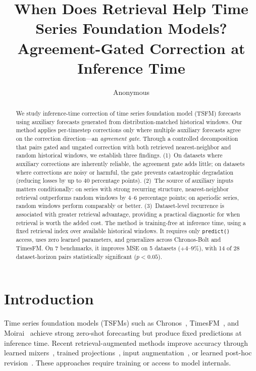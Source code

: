 \documentclass{article}
\title{When Does Retrieval Help Time Series Foundation Models?\\Agreement-Gated Correction at Inference Time}
\author{Anonymous}
\begin{document}
\maketitle

\begin{abstract}
We study inference-time correction of time series foundation model (TSFM) forecasts using auxiliary forecasts generated from distribution-matched historical windows. Our method applies per-timestep corrections only where multiple auxiliary forecasts agree on the correction direction---an \emph{agreement gate}. Through a controlled decomposition that pairs gated and ungated correction with both retrieved nearest-neighbor and random historical windows, we establish three findings. (1)~On datasets where auxiliary corrections are inherently reliable, the agreement gate adds little; on datasets where corrections are noisy or harmful, the gate prevents catastrophic degradation (reducing losses by up to 40 percentage points). (2)~The source of auxiliary inputs matters conditionally: on series with strong recurring structure, nearest-neighbor retrieval outperforms random windows by 4--6 percentage points; on aperiodic series, random windows perform comparably or better. (3)~Dataset-level recurrence is associated with greater retrieval advantage, providing a practical diagnostic for when retrieval is worth the added cost. The method is training-free at inference time, using a fixed retrieval index over available historical windows. It requires only \texttt{predict()} access, uses zero learned parameters, and generalizes across Chronos-Bolt and TimesFM. On 7 benchmarks, it improves MSE on 5 datasets ($+4$--$9\%$), with 14 of 28 dataset-horizon pairs statistically significant ($p < 0.05$).
\end{abstract}

\section{Introduction}

Time series foundation models (TSFMs) such as Chronos~\cite{ansari2024chronos}, TimesFM~\cite{das2024timesfm}, and Moirai~\cite{woo2024moirai} achieve strong zero-shot forecasting but produce fixed predictions at inference time. Recent retrieval-augmented methods improve accuracy through learned mixers~\cite{ning2025tsrag}, trained projections~\cite{han2025raft}, input augmentation~\cite{tire2024raf}, or learned post-hoc revision~\cite{pir2025}. These approaches require training or access to model internals.
\end{document}
